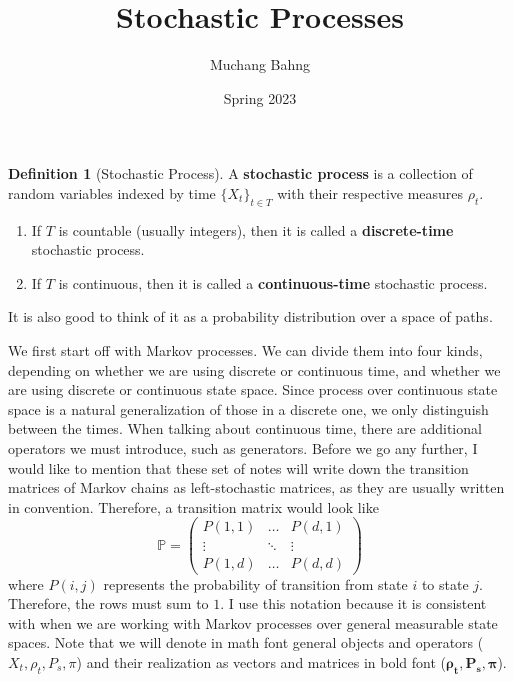\documentclass{article}
\theoremstyle{definition}
\theoremstyle{remark}
\theoremstyle{definition}
\newtheorem{definition}{Definition}[section]
\begin{document}
\pagestyle{fancy}

\cfoot{\thepage / \pageref{LastPage}}

\title{Stochastic Processes}
\author{Muchang Bahng}
\date{Spring 2023}

\maketitle

\begin{definition}[Stochastic Process]
A \textbf{stochastic process} is a collection of random variables indexed by time $\{X_t\}_{t \in T}$ with their respective measures $\rho_t$. 
\begin{enumerate}
    \item If $T$ is countable (usually integers), then it is called a \textbf{discrete-time} stochastic process. 
    \item If $T$ is continuous, then it is called a \textbf{continuous-time} stochastic process. 
\end{enumerate}
It is also good to think of it as a probability distribution over a space of paths. 
\end{definition}

We first start off with Markov processes. We can divide them into four kinds, depending on whether we are using discrete or continuous time, and whether we are using discrete or continuous state space. Since process over continuous state space is a natural generalization of those in a discrete one, we only distinguish between the times. When talking about continuous time, there are additional operators we must introduce, such as generators. Before we go any further, I would like to mention that these set of notes will write down the transition matrices of Markov chains as left-stochastic matrices, as they are usually written in convention. Therefore, a transition matrix would look like 
\[\mathbb{P} = \begin{pmatrix} P(1, 1) & \ldots & P(d, 1) \\ \vdots & \ddots & \vdots \\ P(1, d) & \ldots & P(d, d) \end{pmatrix} \]
where $P(i, j)$ represents the probability of transition from state $i$ to state $j$. Therefore, the rows must sum to $1$. I use this notation because it is consistent with when we are working with Markov processes over general measurable state spaces. Note that we will denote in math font general objects and operators ($X_t, \rho_t, P_s, \pi$) and their realization as vectors and matrices in bold font ($\boldsymbol{\rho_t}, \mathbf{P_s}, \boldsymbol{\pi}$). 
\end{document}
